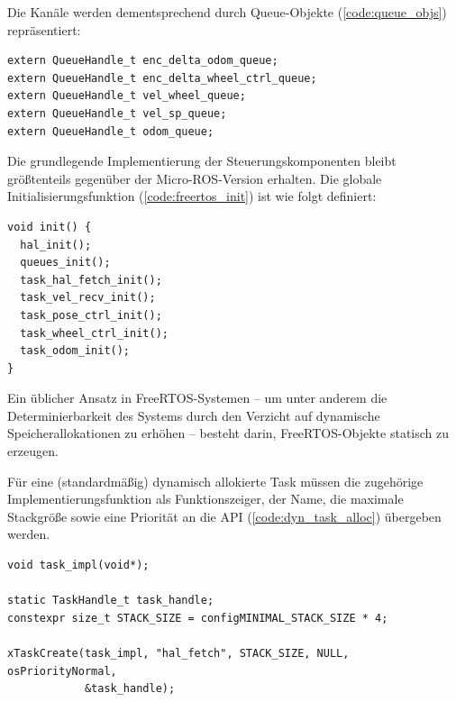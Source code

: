Die Kanäle werden dementsprechend durch Queue-Objekte (\ref{code:queue_objs})
repräsentiert:

\begin{code}
\begin{verbatim}
extern QueueHandle_t enc_delta_odom_queue;
extern QueueHandle_t enc_delta_wheel_ctrl_queue;
extern QueueHandle_t vel_wheel_queue;
extern QueueHandle_t vel_sp_queue;
extern QueueHandle_t odom_queue;
\end{verbatim}
    \label{code:queue_objs}
\end{code}

Die grundlegende Implementierung der Steuerungskomponenten bleibt größtenteils
gegenüber der Micro-ROS-Version erhalten. Die globale Initialisierungsfunktion
(\ref{code:freertos_init}) ist wie folgt definiert:

\begin{code}
\begin{verbatim}
void init() {
  hal_init();
  queues_init();
  task_hal_fetch_init();
  task_vel_recv_init();
  task_pose_ctrl_init();
  task_wheel_ctrl_init();
  task_odom_init();
}
\end{verbatim}
    \label{code:freertos_init}
\end{code}

Ein üblicher Ansatz in FreeRTOS-Systemen -- um unter anderem die
Determinierbarkeit des Systems durch den Verzicht auf dynamische
Speicherallokationen zu erhöhen \cite{freertos_memory_management} -- besteht
darin, FreeRTOS-Objekte statisch zu erzeugen.

Für eine (standardmäßig) dynamisch allokierte Task müssen die zugehörige
Implementierungsfunktion als Funktionszeiger, der Name, die maximale Stackgröße
sowie eine Priorität an die API (\ref{code:dyn_task_alloc}) übergeben werden.

\begin{code}
\begin{verbatim}
void task_impl(void*);

static TaskHandle_t task_handle;
constexpr size_t STACK_SIZE = configMINIMAL_STACK_SIZE * 4;

xTaskCreate(task_impl, "hal_fetch", STACK_SIZE, NULL, osPriorityNormal,
            &task_handle);
\end{verbatim}
    \label{code:dyn_task_alloc}
\end{code}

